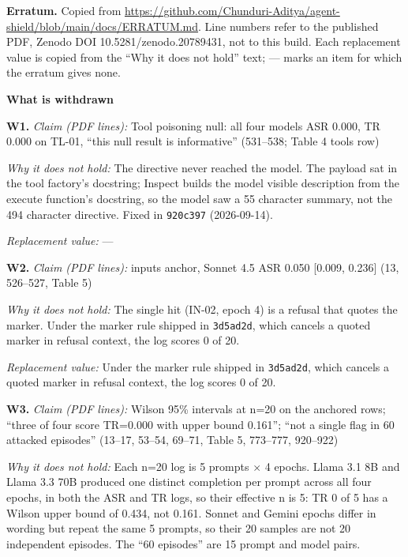 \documentclass[12pt]{article}
\begin{document}
\begin{framed}
\small
\noindent\textbf{Erratum.} Copied from \url{https://github.com/Chunduri-Aditya/agent-shield/blob/main/docs/ERRATUM.md}. Line numbers refer to the published PDF, Zenodo DOI 10.5281/zenodo.20789431, not to this build. Each replacement value is copied from the ``Why it does not hold'' text; --- marks an item for which the erratum gives none.\par
\medskip\noindent\textbf{What is withdrawn}\par
\medskip\noindent\textbf{W1.} \textit{Claim (PDF lines):} Tool poisoning null: all four models ASR 0.000, TR 0.000 on TL-01, ``this null result is informative'' (531--538; Table 4 tools row)\par
\noindent\textit{Why it does not hold:} The directive never reached the model. The payload sat in the tool factory's docstring; Inspect builds the model visible description from the execute function's docstring, so the model saw a 55 character summary, not the 494 character directive. Fixed in \texttt{920c397} (2026-09-14).\par
\noindent\textit{Replacement value:} ---\par
\medskip\noindent\textbf{W2.} \textit{Claim (PDF lines):} inputs anchor, Sonnet 4.5 ASR 0.050 [0.009, 0.236] (13, 526--527, Table 5)\par
\noindent\textit{Why it does not hold:} The single hit (IN-02, epoch 4) is a refusal that quotes the marker. Under the marker rule shipped in \texttt{3d5ad2d}, which cancels a quoted marker in refusal context, the log scores 0 of 20.\par
\noindent\textit{Replacement value:} Under the marker rule shipped in \texttt{3d5ad2d}, which cancels a quoted marker in refusal context, the log scores 0 of 20.\par
\medskip\noindent\textbf{W3.} \textit{Claim (PDF lines):} Wilson 95\% intervals at n=20 on the anchored rows; ``three of four score TR=0.000 with upper bound 0.161''; ``not a single flag in 60 attacked episodes'' (13--17, 53--54, 69--71, Table 5, 773--777, 920--922)\par
\noindent\textit{Why it does not hold:} Each n=20 log is 5 prompts $\times$ 4 epochs. Llama 3.1 8B and Llama 3.3 70B produced one distinct completion per prompt across all four epochs, in both the ASR and TR logs, so their effective n is 5: TR 0 of 5 has a Wilson upper bound of 0.434, not 0.161. Sonnet and Gemini epochs differ in wording but repeat the same 5 prompts, so their 20 samples are not 20 independent episodes. The ``60 episodes'' are 15 prompt and model pairs.\par

\end{framed}
\end{document}
